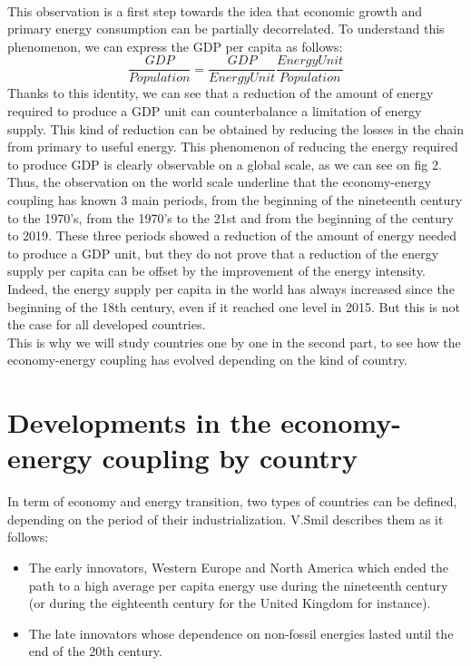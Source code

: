 \documentclass[conference]{IEEEtran}
\begin{document}
\\
This observation is a first step towards the idea that economic growth and primary energy consumption can be partially decorrelated. 
To understand this phenomenon, we can express the GDP per capita as follows: 
\begin{equation}
    \frac{GDP}{Population}=\frac{GDP}{Energy Unit}\frac{Energy Unit}{Population}
\end{equation}
Thanks to this identity, we can see that a reduction of the amount of energy required to produce a GDP unit can counterbalance a limitation of energy supply. This kind of reduction can be obtained by reducing the losses in the chain from primary to useful energy. 
This phenomenon of reducing the energy required to produce GDP is clearly observable on a global scale, as we can see on fig 2.  Thus, the observation on the world scale underline that the economy-energy coupling has known 3 main periods, from the beginning of the nineteenth century to the 1970’s, from the 1970’s to the 21st and from the beginning of the century to 2019. These three periods showed a reduction of the amount of energy needed to produce a GDP unit, but they do not prove that a reduction of the energy supply per capita can be offset by the improvement of the energy intensity. Indeed, the energy supply per capita in the world has always increased since the beginning of the 18th century, even if it reached one level in 2015. But this is not the case for all developed countries. 
\\
This is why we will study countries one by one in the second part, to see how the economy-energy coupling has evolved depending on the kind of country. 



\section{Developments in the economy-energy coupling by country} 
In term of economy and energy transition, two types of countries can be defined, depending on the period of their industrialization. V.Smil \cite{smil_energy_2010} describes them as it follows: 
\begin{itemize}
    \item The early innovators, Western Europe and North America which ended the path to a high average per capita energy use during the nineteenth century (or during the eighteenth century for the United Kingdom for instance). 
    \item The late innovators whose dependence on non-fossil energies lasted until the end of the 20th century.
\end{itemize}
	 
\end{document}
